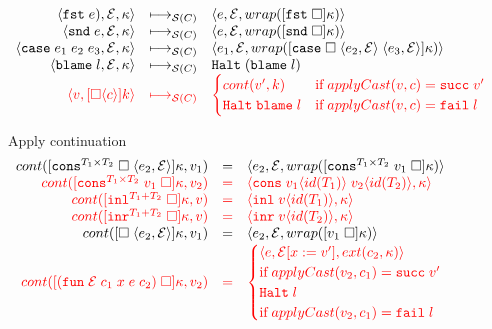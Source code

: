 \documentclass[acmsmall,review,anonymous]{acmart}\settopmatter{printfolios=true,printccs=false,printacmref=false}
\newcommand{\funrule}[3]{#1 &=& #2 & #3\\}
\newcommand{\hifunrule}[3]{\highlight{#1} &\highlight{=}& \highlight{#2} & 
\highlight{#3}\\}
\newcommand{\plus}[0]{+}
\newcommand{\sOOinspect}[3]{\langle#1,#2,#3\rangle}
\newcommand{\sOOreturn}[2]{\langle#1,#2\rangle}
\newcommand{\sOOhalt}[1]{\mathtt{Halt} \; #1}
\newcommand{\POOprod}[2]{#1 \times #2}
\newcommand{\POOsum}[2]{#1 \plus #2}
\newcommand{\eOOcar}[1]{\mathtt{fst} \; #1}
\newcommand{\eOOcdr}[1]{\mathtt{snd} \; #1}
\newcommand{\eOOcase}[3]{\mathtt{case} \; #1 \; #2 \; #3}
\newcommand{\eOOblame}[1]{\mathtt{blame} \; #1}
\newcommand{\oOOblame}[1]{\mathtt{blame} \; #1}
\newcommand{\rOOsucc}[1]{\mathtt{succ}\;#1}
\newcommand{\rOOfail}[1]{\mathtt{fail}\;#1}
\newcommand{\kOOconsI}[5]{
	[\mathtt{cons}^{\POOprod{#1}{#2}} \; \square \; \langle#3,#4\rangle ]#5}
\newcommand{\kOOconsII}[4]{
	[\mathtt{cons}^{\POOprod{#1}{#2}} \; #3 \; \square]#4}
\newcommand{\kOOinl}[3]{[\mathtt{inl}^{\POOsum{#1}{#2}}\; \square]#3}
\newcommand{\kOOinr}[3]{[\mathtt{inr}^{\POOsum{#1}{#2}}\; \square]#3}
\newcommand{\kOOappI}[3]{
  [\square \; \langle#1,#2\rangle]#3
}
\newcommand{\kOOappII}[2]{
  [#1 \; \square]#2}
\newcommand{\kOOcar}[1]{[\mathtt{fst} \; \square]#1}
\newcommand{\kOOcdr}[1]{[\mathtt{snd} \; \square]#1}
\newcommand{\kOOcaseI}[4]{
  [\mathtt{case} \; \square \; \langle#1,#3\rangle \; \langle#2,#3\rangle ]#4}
\newcommand{\kOOcast}[2]{
  [\square \langle #1 \rangle]#2}
\newcommand{\hcvOOfun}[5]{\mathtt{fun} \; #2 \; #1 \; #3 \; #4 \; #5}
\newcommand{\hcvOOcons}[4]{\mathtt{cons}\;#1\langle#2\rangle\;#3\langle#4\rangle}
\newcommand{\hcvOOinl}[2]{\mathtt{inl}\;#1\langle#2\rangle}
\newcommand{\hcvOOinr}[2]{\mathtt{inr}\;#1\langle#2\rangle}
\newcommand{\sidecond}[1]{\text{if}\;#1}
\newcommand{\redruleS}[3]{#1 & \longmapsto_{\mathcal{S}(C)} & #2 & #3\\}
\newcommand{\hiredruleS}[3]{\highlight{#1} & 
\highlight{\longmapsto_{\mathcal{S}(C)}} & \highlight{#2} & \highlight{#3} \\}
\newcommand{\continue}[2]{cont(#2,#1)}
\newcommand{\highlight}[1]{{\color{red} #1}}
\begin{document}
\begin{figure}
\[\begin{array}{rclr}
  \redruleS{
    \sOOinspect{\eOOcar{e})}{\mathcal{E}}{\kappa}}{
    \sOOinspect{e}{\mathcal{E}}{wrap(\kOOcar{\kappa})}}{}
  
  \redruleS{
    \sOOinspect{\eOOcdr{e}}{\mathcal{E}}{\kappa}}{
    \sOOinspect{e}{\mathcal{E}}{wrap(\kOOcdr{\kappa})}}{}
  
  \redruleS{
    \sOOinspect{\eOOcase{e_1}{e_2}{e_3}}{\mathcal{E}}{\kappa}}{
    \sOOinspect{e_1}{\mathcal{E}}{wrap(\kOOcaseI{e_2}{e_3}{\mathcal{E}}{\kappa})}}{}


\redruleS{
	\sOOinspect{\eOOblame{l}}{\mathcal{E}}{\kappa}}{
	\sOOhalt{(\oOOblame{l})}}{}

  \hiredruleS{
    \sOOreturn{v}{\kOOcast{c}{k}}
  }{
  \begin{cases}
  \continue{k}{v'} & \sidecond{applyCast(v,c) = \rOOsucc{v'}} 
  \\
  \sOOhalt{\oOOblame{l}} & \sidecond{applyCast(v,c) = \rOOfail{l}}
  \end{cases}
  }{}
  \end{array}
  \]
  
  Apply continuation
  \fbox{$\continue{k}{v} = s$}
  \[
  \begin{array}{rclr}
  

\funrule{
  \continue{v_1}{\kOOconsI{T_1}{T_2}{e_2}{\mathcal{E}}{\kappa}}}{
  \sOOinspect{e_2}{\mathcal{E}}{wrap(\kOOconsII{T_1}{T_2}{v_1}{\kappa})}}{}

\hifunrule{
  \continue{v_2}{\kOOconsII{T_1}{T_2}{v_1}{\kappa}}}{
  \sOOreturn{\hcvOOcons{v_1}{id(T_1)}{v_2}{id(T_2)}}{\kappa}}{}

\hifunrule{
  \continue{v}{\kOOinl{T_1}{T_2}{\kappa}}}{
  \sOOreturn{\hcvOOinl{v}{id(T_1)}}{\kappa}}{}

\hifunrule{
  \continue{v}{\kOOinr{T_1}{T_2}{\kappa}}}{
  \sOOreturn{\hcvOOinr{v}{id(T_2)}}{\kappa}}{}

\funrule{
  \continue{v_1}{\kOOappI{e_2}{\mathcal{E}}{\kappa}}}{
  \sOOinspect{e_2}{\mathcal{E}}{
    wrap(\kOOappII{v_1}{\kappa})
  }}{}

\hifunrule{
  \continue{v_2}{\kOOappII{(\hcvOOfun{c_1}{\mathcal{E}}{x}{e}{c_2})}{\kappa}}}{
\begin{cases}
\sOOinspect{e}{\mathcal{E}[x:=v']}{ext(c_2,\kappa)} \\
\sidecond{applyCast(v_2,c_1) = \rOOsucc{v'}}
\\
\sOOhalt{l} \\
\sidecond{applyCast(v_2,c_1) = \rOOfail{l}}
\end{cases}
}{}



\end{array}\]
\end{figure}
\end{document}
